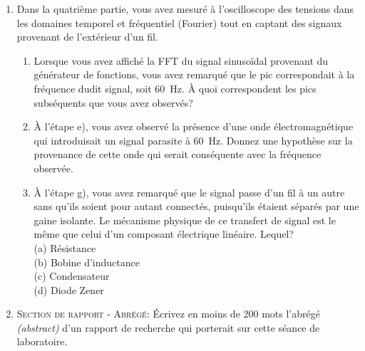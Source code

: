 \documentclass[canadien,12pt,oneside,letterpaper]{article}
\begin{document}
\begin{enumerate}
\begin{enumerate}
        \noindent{}
    \end{enumerate}
    \vspace{1ex}
    \item Dans la quatrième partie, vous avez mesuré à l'oscilloscope des tensions dans les domaines temporel et fréquentiel (Fourier) tout en captant des signaux provenant de l'extérieur d'un fil.
    \begin{enumerate} 
        \item Lorsque vous avez affiché la FFT du signal sinusoïdal provenant du générateur de fonctions, vous avez remarqué que le pic correspondait à la fréquence dudit signal, soit 60~Hz. À quoi correspondent les pics subséquents que vous avez observés?
        \item À l'étape e), vous avez observé la présence d'une onde électromagnétique qui introduisait un signal parasite à 60~Hz. Donnez une hypothèse sur la provenance de cette onde qui serait conséquente avec la fréquence observée.
        \item À l'étape g), vous avez remarqué que le signal passe d'un fil à un autre sans qu'ils soient pour autant connectés, puisqu'ils étaient séparés par une gaine isolante. Le mécanisme physique de ce transfert de signal est le même que celui d'un composant électrique linéaire. Lequel?\\(a) Résistance\\(b) Bobine d'inductance\\(c) Condensateur\\(d) Diode Zener
    \end{enumerate}
    \item \textsc{Section de rapport - Abrégé:} Écrivez en moins de 200 mots l'abrégé \textit{(abstract)} d'un rapport de recherche qui porterait sur cette séance de laboratoire.
\end{enumerate}
\end{document}
